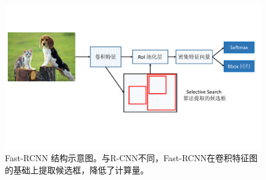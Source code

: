 \begin{figure}[t]
	\centering
	\includegraphics[trim={1.1cm, 4.2cm, 0.5cm, 2cm}, clip,width=\textwidth]{./imgs/Fast-RCNN.pdf}
	\caption{Fast-RCNN 结构示意图。与R-CNN不同，Fast-RCNN在卷积特征图的基础上提取候选框，降低了计算量。}
	\label{fig:fast-rcnn}
\end{figure}

